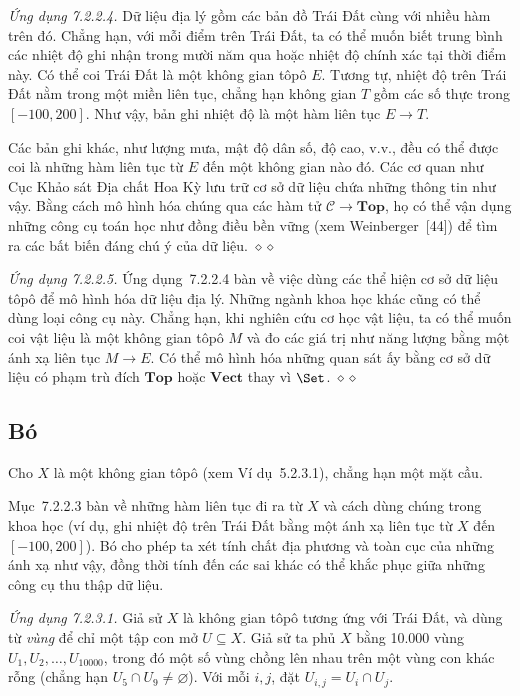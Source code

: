\noindent\textit{Ứng dụng 7.2.2.4.}\keepwithnext
Dữ liệu địa lý gồm các bản đồ Trái Đất cùng với nhiều hàm trên đó. Chẳng hạn, với mỗi điểm trên Trái Đất, ta có thể muốn biết trung bình các nhiệt độ ghi nhận trong mười năm qua hoặc nhiệt độ chính xác tại thời điểm này. Có thể coi Trái Đất là một không gian tôpô $E$. Tương tự, nhiệt độ trên Trái Đất nằm trong một miền liên tục, chẳng hạn không gian $T$ gồm các số thực trong $[-100,200]$. Như vậy, bản ghi nhiệt độ là một hàm liên tục $E\to T$.

Các bản ghi khác, như lượng mưa, mật độ dân số, độ cao, v.v., đều có thể được coi là những hàm liên tục từ $E$ đến một không gian nào đó. Các cơ quan như Cục Khảo sát Địa chất Hoa Kỳ lưu trữ cơ sở dữ liệu chứa những thông tin như vậy. Bằng cách mô hình hóa chúng qua các hàm tử $\mathcal C\to\mathbf{Top}$, họ có thể vận dụng những công cụ toán học như đồng điều bền vững (xem Weinberger~[44]) để tìm ra các bất biến đáng chú ý của dữ liệu.
\hfill$\diamond\diamond$

\noindent\textit{Ứng dụng 7.2.2.5.}\keepwithnext
Ứng dụng~7.2.2.4 bàn về việc dùng các thể hiện cơ sở dữ liệu tôpô để mô hình hóa dữ liệu địa lý. Những ngành khoa học khác cũng có thể dùng loại công cụ này. Chẳng hạn, khi nghiên cứu cơ học vật liệu, ta có thể muốn coi vật liệu là một không gian tôpô $M$ và đo các giá trị như năng lượng bằng một ánh xạ liên tục $M\to E$. Có thể mô hình hóa những quan sát ấy bằng cơ sở dữ liệu có phạm trù đích $\mathbf{Top}$ hoặc $\mathbf{Vect}$ thay vì $\Set$.
\hfill$\diamond\diamond$

\subsection{Bó}
Cho $X$ là một không gian tôpô (xem Ví dụ~5.2.3.1), chẳng hạn một mặt cầu.

Mục~7.2.2.3 bàn về những hàm liên tục đi ra từ $X$ và cách dùng chúng trong khoa học (ví dụ, ghi nhiệt độ trên Trái Đất bằng một ánh xạ liên tục từ $X$ đến $[-100,200]$). Bó cho phép ta xét tính chất địa phương và toàn cục của những ánh xạ như vậy, đồng thời tính đến các sai khác có thể khắc phục giữa những công cụ thu thập dữ liệu.

\noindent\textit{Ứng dụng 7.2.3.1.}\keepwithnext
Giả sử $X$ là không gian tôpô tương ứng với Trái Đất, và dùng từ \emph{vùng} để chỉ một tập con mở $U\subseteq X$. Giả sử ta phủ $X$ bằng 10.000 vùng $U_1,U_2,\ldots,U_{10000}$, trong đó một số vùng chồng lên nhau trên một vùng con khác rỗng (chẳng hạn $U_5\cap U_9\ne\varnothing$). Với mỗi $i,j$, đặt $U_{i,j}=U_i\cap U_j$.

